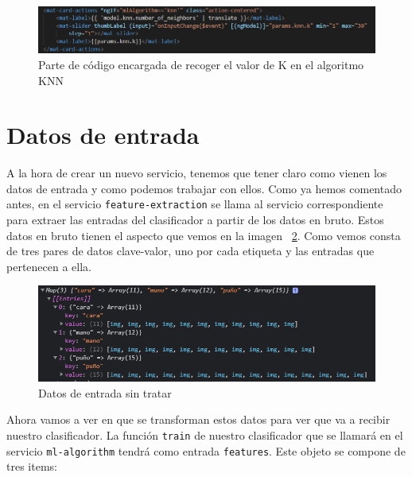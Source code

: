 \documentclass[a4paper, 12pt]{book}
\begin{document}
\begin{figure}
	\centering
	\includegraphics[width=12cm, keepaspectratio]{img/nvecinosknn}
	\caption{Parte de código encargada de recoger el valor de K en el algoritmo KNN}				
        \label{fig:nvecinosknn}
\end{figure}

\section{Datos de entrada} 
\label{sec:datosdeentrada}

A la hora de crear un nuevo servicio, tenemos que tener claro como vienen los datos de entrada y como podemos trabajar con ellos. Como ya hemos comentado antes, en el servicio \texttt{feature-extraction} se llama al servicio correspondiente para extraer las entradas del clasificador a partir de los datos en bruto. Estos datos en bruto tienen el aspecto que vemos en la imagen ~\ref{fig:datosenbruto}. Como vemos consta de tres pares de datos clave-valor, uno por cada etiqueta y las entradas que pertenecen a ella.

\begin{figure}
	\centering
	\includegraphics[width=12cm, keepaspectratio]{img/datosenbruto}
	\caption{Datos de entrada sin tratar}				
	\label{fig:datosenbruto}
\end{figure}

Ahora vamos a ver en que se transforman estos datos para ver que va a recibir nuestro clasificador. La función \texttt{train} de nuestro clasificador que se llamará en el servicio \texttt{ml-algorithm} tendrá como entrada \texttt{features}. Este objeto se compone de tres items:
\end{document}
